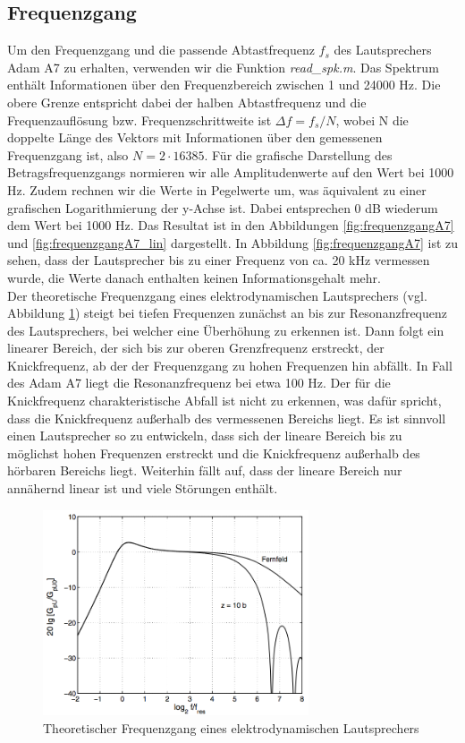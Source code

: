\subsection{Frequenzgang}
\label{subsec:b}
Um den Frequenzgang und die passende Abtastfrequenz $f_s$ des Lautsprechers Adam A7 zu erhalten, verwenden wir die Funktion \textit{read\_spk.m}.
Das Spektrum enthält Informationen über den Frequenzbereich zwischen 1 und 24000 Hz.
Die obere Grenze entspricht dabei der halben Abtastfrequenz und die Frequenzauflösung bzw. Frequenzschrittweite ist $\Delta f = f_s / N$, wobei N die doppelte Länge des Vektors mit Informationen über den gemessenen Frequenzgang ist, also $N = 2 \cdot 16385$.
Für die grafische Darstellung des Betragsfrequenzgangs normieren wir alle Amplitudenwerte auf den Wert bei 1000 Hz.
Zudem rechnen wir die Werte in Pegelwerte um, was äquivalent zu einer grafischen Logarithmierung der y-Achse ist.
Dabei entsprechen 0 dB wiederum dem Wert bei 1000 Hz.
Das Resultat ist in den Abbildungen \ref{fig:frequenzgangA7} und \ref{fig:frequenzgangA7_lin} dargestellt. 
In Abbildung \ref{fig:frequenzgangA7} ist zu sehen, dass der Lautsprecher bis zu einer Frequenz von ca. 20 kHz vermessen wurde, die Werte danach enthalten keinen Informationsgehalt mehr.\\
Der theoretische Frequenzgang eines elektrodynamischen Lautsprechers (vgl. Abbildung \ref{fig:ideal}) steigt bei tiefen Frequenzen zunächst an bis zur Resonanzfrequenz des Lautsprechers, bei welcher eine Überhöhung zu erkennen ist.
Dann folgt ein linearer Bereich, der sich bis zur oberen Grenzfrequenz erstreckt, der Knickfrequenz, ab der der Frequenzgang zu hohen Frequenzen hin abfällt. 
In Fall des Adam A7 liegt die Resonanzfrequenz bei etwa 100 Hz.
Der für die Knickfrequenz charakteristische Abfall ist nicht zu erkennen, was dafür spricht, dass die Knickfrequenz außerhalb des vermessenen Bereichs liegt.
Es ist sinnvoll einen Lautsprecher so zu entwickeln, dass sich der lineare Bereich bis zu möglichst hohen Frequenzen erstreckt und die Knickfrequenz außerhalb des hörbaren Bereichs liegt.
Weiterhin fällt auf, dass der lineare Bereich nur annähernd linear ist und viele Störungen enthält.\\


\begin{figure}[H]
        \centering
        \includegraphics[width=0.7\textwidth]{Figures/elekdyn.png}
        \caption{Theoretischer Frequenzgang eines elektrodynamischen Lautsprechers \cite{moeser15}}
        \label{fig:ideal}
\end{figure}

